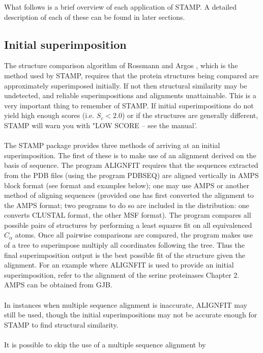 What follows is a brief overview of each application of STAMP.  A
detailed description of each of these can be found in later
sections.

\subsection{Initial superimposition}

The structure comparison algorithm of Rossmann and Argos 
\cite{rossmann74}, which is the method used by STAMP, requires that the 
protein structures being compared are approximately superimposed 
initially.  If not then structural similarity may be undetected, and 
reliable superimpositions and alignments unattainable.  This is a very important
thing to remember of STAMP.  If initial superimpositions do not yield high
enough scores (i.e. $S_{c} < 2.0$) or if the structures are generally different, 
STAMP will warn you with "LOW SCORE -- see the manual'.\\
\\
The STAMP package provides three methods of arriving at an initial 
superimposition.  The first of these is to make use of an alignment
derived on the basis of sequence.  The program ALIGNFIT requires
that the sequences extracted from the PDB files (using the program
PDBSEQ) are aligned vertically in AMPS block format (see format and
examples below); one may use AMPS or another method of aligning sequences 
(provided one has first converted the alignment to the AMPS format; 
two programs to do so are included in the distribution: one converts CLUSTAL
format, the other MSF format).
The program compares all possible pairs of
structures by performing a least squares fit on all equivalenced 
$C_{\alpha}$ atoms.  Once all pairwise comparisons are compared, the
program makes use of a tree to superimpose  multiply all
coordinates following the tree.  Thus the final superimposition
output is the best possible fit of the structure given the
alignment.  For an example where ALIGNFIT is used to provide an
initial superimposition, refer to the alignment of the serine
proteinases Chapter 2.  AMPS can be obtained from GJB.\\
\\
In instances when multiple sequence alignment is inaccurate,
ALIGNFIT may still be used, though the initial superimpositions may
not be accurate enough for STAMP to find structural similarity. \\
\\
It is possible to skip the use of a multiple sequence alignment by 
